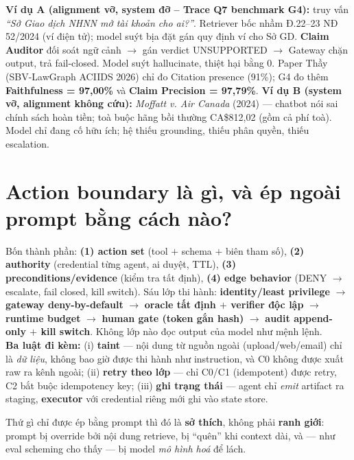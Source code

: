 \documentclass[10pt,a4paper]{article}
\begin{document}
\textbf{Ví dụ A (alignment vỡ, system đỡ -- Trace Q7 benchmark G4):} truy vấn \emph{``Sở Giao dịch NHNN mở tài khoản cho ai?''}. Retriever bốc nhầm Đ.22--23 NĐ 52/2024 (ví điện tử); model suýt bịa đặt gán quy định ví cho Sở GD. \textbf{Claim Auditor} đối soát ngữ cảnh $\to$ gán verdict UNSUPPORTED $\to$ Gateway chặn output, trả fail-closed. Model suýt hallucinate, thiệt hại bằng 0. Paper Thầy (SBV-LawGraph ACIIDS 2026) chỉ đo Citation presence (91\%); G4 đo thêm \textbf{Faithfulness = 97,00\%} và \textbf{Claim Precision = 97,79\%}.
\textbf{Ví dụ B (system vỡ, alignment không cứu):} \emph{Moffatt v. Air Canada} (2024) --- chatbot nói sai chính sách
hoàn tiền; toà buộc hãng bồi thường CA\$812,02 (gồm cả phí toà). Model chỉ đang cố hữu ích; hệ thiếu grounding, thiếu phân quyền,
thiếu escalation.

\section{Action boundary là gì, và ép ngoài prompt bằng cách nào?}
Bốn thành phần: \textbf{(1) action set} (tool $+$ schema $+$ biên tham số), \textbf{(2) authority} (credential từng agent,
ai duyệt, TTL), \textbf{(3) preconditions/evidence} (kiểm tra tất định), \textbf{(4) edge behavior} (DENY $\to$ escalate,
fail closed, kill switch). Sáu lớp thi hành: \textbf{identity/least privilege} $\to$ \textbf{gateway deny-by-default}
$\to$ \textbf{oracle tất định $+$ verifier độc lập} $\to$ \textbf{runtime budget} $\to$ \textbf{human gate (token gắn
hash)} $\to$ \textbf{audit append-only $+$ kill switch}. Không lớp nào đọc output của model như mệnh lệnh.\\
\textbf{Ba luật đi kèm:} (i) \textbf{taint} --- nội dung từ nguồn ngoài (upload/web/email) chỉ là \emph{dữ liệu},
không bao giờ được thi hành như instruction, và C0 không được xuất raw ra kênh ngoài; (ii) \textbf{retry theo lớp} ---
chỉ C0/C1 (idempotent) được retry, C2 bắt buộc idempotency key; (iii) \textbf{ghi trạng thái} --- agent chỉ \emph{emit}
artifact ra staging, \textbf{executor} với credential riêng mới ghi vào state store.

\begin{keybox}
Thứ gì chỉ được ép bằng prompt thì đó là \textbf{sở thích}, không phải \textbf{ranh giới}: prompt bị override bởi nội dung
retrieve, bị ``quên'' khi context dài, và --- như eval scheming cho thấy --- bị model \emph{mô hình hoá} để lách.
\end{keybox}
\end{document}
